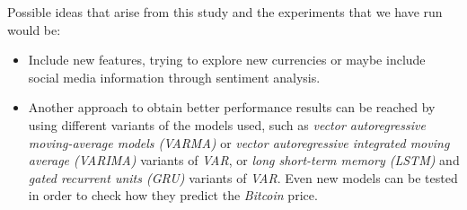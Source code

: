 Possible ideas that arise from this study and the experiments that we
have run would be:

\begin{itemize}
\item Include new features, trying to explore new currencies or maybe
  include social media information through sentiment analysis.
\item Another approach to obtain better performance results can be
  reached by using different variants of the models used, such as
  \textit{vector autoregressive moving-average models (VARMA)} or
  \textit{vector autoregressive integrated moving average (VARIMA)}
  variants of \textit{VAR}, or \textit{long short-term memory (LSTM)}
  and \textit{gated recurrent units (GRU)} variants of \textit{VAR}.
  Even new models can be tested in order to check how they predict the
  \textit{Bitcoin} price.
\end{itemize}




